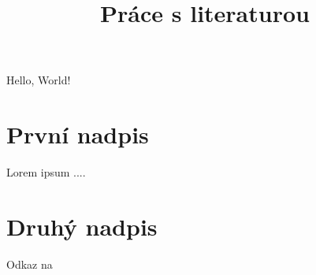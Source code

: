 \documentclass{article}
\title{Práce s literaturou}
\begin{document}
\maketitle


Hello, World!

\section{První nadpis}


Lorem ipsum ....

\section{Druhý nadpis}

Odkaz na 



\end{document}
